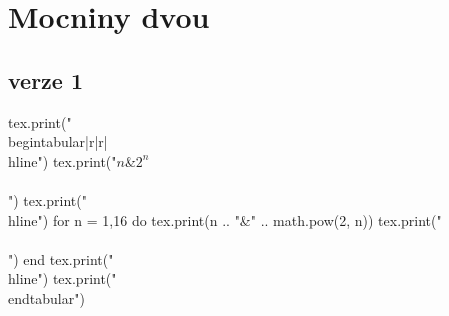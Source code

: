 \documentclass{article}
\begin{document}
\section*{Mocniny dvou}

\subsection*{verze 1}

\begin{luacode*}
tex.print("\\begin{tabular}{|r|r|}\\hline")
tex.print("$n$&$2^n$\\\\")
tex.print("\\hline")
for n = 1,16 do
    tex.print(n .. "&" .. math.pow(2, n))
    tex.print("\\\\")
end
tex.print("\\hline")
tex.print("\\end{tabular}")
\end{luacode*}
\end{document}
